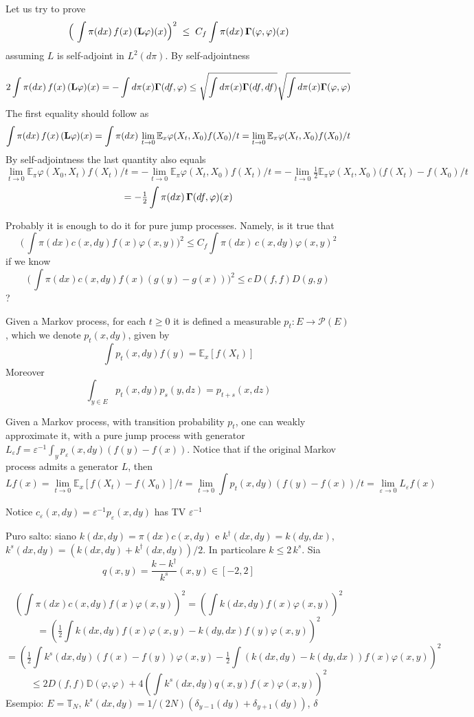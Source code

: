 \documentclass[reqno]{amsart}
\newcounter{as}[section]
\newcommand{\mc}[1]{{\mathcal #1}}
\newcommand{\bb}[1]{{\mathbb #1}}
\newcommand{\<}{\langle}
\renewcommand{\>}{\rangle}
\begin{document}
\newpage
Let us try to prove
$$\Big(\, \int \pi(dx)\, f(x)\, ({\bf L} \varphi)(x) \Big)^2 \;\le\;
C_f \int \pi(dx)\, {\bf \Gamma}(\varphi,\varphi)(x)$$
assuming $L$ is self-adjoint in $L^2(d\pi)$. By self-adjointness

$$2 \int \pi(dx)\, f(x)\, ({\bf L} \varphi)(x)=- \int d\pi(x) {\bf \Gamma}(df,\varphi)
\le \sqrt{\int d\pi(x) {\bf \Gamma}(df,df) } \sqrt{ \int d\pi(x) {\bf \Gamma}(\varphi,\varphi) }
$$
The first equality should follow as
$$ \int \pi(dx)\, f(x)\, ({\bf L} \varphi)(x)= \int \pi(dx)\,  \lim_{t\to 0} \bb E_x \varphi(X_t,X_0) f(X_0)/t= \lim_{t\to 0} \bb E_\pi \varphi(X_t,X_0) f(X_0)/t
$$
By self-adjointness the last quantity also equals
$$ \lim_{t\to 0} \bb E_\pi \varphi(X_0,X_t) f(X_t)/t=
 -\lim_{t\to 0} \bb E_\pi \varphi(X_t,X_0) f(X_t)/t=
 -\lim_{t\to 0}\tfrac{1}{2} \bb E_\pi \varphi(X_t,X_0)( f(X_t)-f(X_0)/t$$
$$=-\tfrac 12 \int \pi(dx)\, {\bf \Gamma}(df,\varphi)(x)
$$

\bigskip
Probably it is enough to do it for pure jump processes. Namely, is it true that
$$\Big(\, \int \pi(dx) c(x,dy) f(x) \varphi(x,y) \Big)^2 \le 
C_f \int \pi(dx)\, c(x,dy) \varphi(x,y)^2
$$
if we know
$$\Big(\, \int \pi(dx) c(x,dy) f(x) (g(y)-g(x)) \Big)^2 \le  c\,
D(f,f) D(g,g)
$$
?

\newpage
Given a Markov process, for each $t\ge 0$ it is defined a measurable $p_t\colon E\to \mc P(E)$, which we denote $p_t(x,dy)$, given by
$$
\int p_t(x,dy) f(y) =\mathbb{E}_x[f(X_t)]
$$
Moreover
$$
\int_{y\in E} p_t(x,dy) p_s(y,dz)=p_{t+s}(x,dz)
$$

Given a Markov process, with transition probability $p_t$, one can weakly approximate it, with a pure jump process with generator $L_{\varepsilon}f=\varepsilon^{-1} \int_y p_\varepsilon(x,dy) (f(y)-f(x))$. Notice that if the original Markov process admits a generator $L$, then
$$
Lf(x) = \lim_{t\to 0} \mathbb{E}_{x} [f(X_t)-f(X_0)]/t= \lim_{t \to 0} \int p_t(x,dy) (f(y)-f(x))/t=\lim_{\varepsilon \to 0} L_{\varepsilon}f(x)
$$

Notice $c_\varepsilon(x,dy)=\varepsilon^{-1}p_{\varepsilon}(x,dy)$ has TV $\varepsilon^{-1}$

\bigskip

Puro salto: siano $k(dx,dy)=\pi(dx)c(x,dy)$ e $k^\dagger(dx,dy)=k(dy,dx)$, $k^s(dx,dy)=(k(dx,dy)+k^\dagger(dx,dy))/2$. In particolare $k\le 2 \,k^s$. Sia
$$
q(x,y)= \frac{k-k^\dagger}{k^s}(x,y) \in [-2,2]
$$

$$(\int \pi(dx)c(x,dy) f(x)\varphi(x,y))^2
=(\int k(dx,dy) f(x)\varphi(x,y))^2
$$
$$
=(\tfrac 12 \int k(dx,dy) f(x)\varphi(x,y)-k(dy,dx) f(y)\varphi(x,y)    )^2
$$
$$
=(\tfrac 12 \int k^s(dx,dy) (f(x)-f(y))\varphi(x,y)
-\tfrac 12 \int (k(dx,dy)-k(dy,dx)) f(x)\varphi(x,y) )^2
$$
$$
\le 2 D(f,f)\mathbb{D}(\varphi,\varphi)+4 (\int k^s(dx,dy) q(x,y) f(x) \varphi(x,y))^2
$$
Esempio: $E=\mathbb{T}_N$, $k^s(dx,dy)=1/(2N)(\delta_{y-1}(dy)+\delta_{y+1}(dy))$, $\delta$
\end{document}
